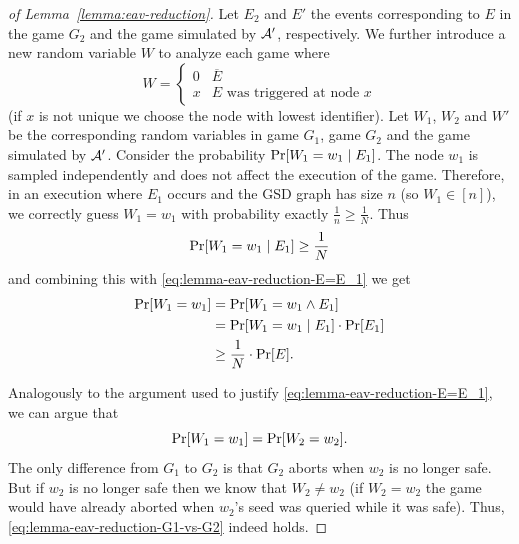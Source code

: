 \begin{proof}[of Lemma~\ref{lemma:eav-reduction}]
	Let $E_2$ and $E'$ the events corresponding to $E$ in the game $G_2$ and the game simulated by $\mathcal{A}'$, respectively. We further introduce a new random variable $W$ to analyze each game where
	\[
		W = \begin{cases}
			0 & \overline{E}                       \\
			x & E \text{ was triggered at node } x
		\end{cases}
	\]
	(if $x$ is not unique we choose the node with lowest identifier).
	Let $W_1$, $W_2$ and $W'$ be the corresponding random variables in game $G_1$, game $G_2$ and the game simulated by $\mathcal{A}'$. Consider the probability $\pr{W_1 = w_1 \mid E_1}$. The node $w_1$ is sampled independently and does not affect the execution of the game. Therefore, in an execution where $E_1$ occurs and the GSD graph has size $n$ (so $W_1 \in [n]$), we correctly guess $W_1 = w_1$ with probability exactly $\frac{1}{n} \ge \frac{1}{N}$. Thus
	\[
		\pr{W_1 = w_1 \mid E_1} \ge \frac{1}{N}
	\]
	and combining this with \eqref{eq:lemma-eav-reduction-E=E_1} we get
	\begin{align} \label{eq:lemma-eav-reduction-detect-E1-G1}
		\begin{split}
			\pr{W_1 = w_1} & = \pr{W_1 = w_1 \land E_1} \\
			& = \pr{W_1 = w_1 \mid E_1} \cdot \pr{E_1} \\
			& \ge \frac{1}{N} \cdot \pr{E}.
		\end{split}
	\end{align}

	Analogously to the argument used to justify \eqref{eq:lemma-eav-reduction-E=E_1}, we can argue that
	\begin{equation} \label{eq:lemma-eav-reduction-G1-vs-G2}
		\pr{W_1 = w_1} = \pr{W_2 = w_2}.
	\end{equation}
	The only difference from $G_1$ to $G_2$ is that $G_2$ aborts when $w_2$ is no longer safe. But if $w_2$ is no longer safe then we know that $W_2 \neq w_2$ (if $W_2 = w_2$ the game would have already aborted when $w_2$'s seed was queried while it was safe). Thus, \eqref{eq:lemma-eav-reduction-G1-vs-G2} indeed holds.


\end{proof}
